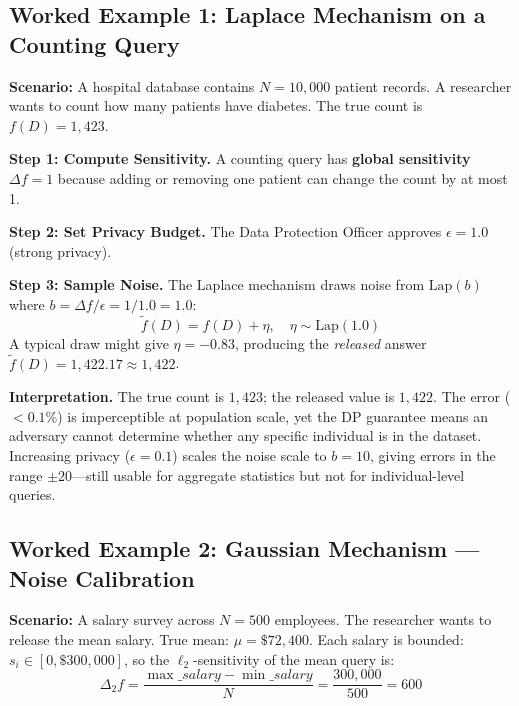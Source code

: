 \subsection{Worked Example 1: Laplace Mechanism on a Counting Query}
\label{subsec:laplace_example}

\textbf{Scenario:} A hospital database contains $N = 10{,}000$ patient records. A researcher wants to count how many patients have diabetes. The true count is $f(D) = 1{,}423$.

\textbf{Step 1: Compute Sensitivity.}
A counting query has \textbf{global sensitivity} $\Delta f = 1$ because adding or removing one patient can change the count by at most 1.

\textbf{Step 2: Set Privacy Budget.}
The Data Protection Officer approves $\epsilon = 1.0$ (strong privacy).

\textbf{Step 3: Sample Noise.}
The Laplace mechanism draws noise from $\text{Lap}(b)$ where $b = \Delta f / \epsilon = 1/1.0 = 1.0$:
\begin{equation}
  \tilde{f}(D) = f(D) + \eta, \quad \eta \sim \text{Lap}(1.0)
\end{equation}
A typical draw might give $\eta = -0.83$, producing the \emph{released} answer $\tilde{f}(D) = 1{,}422.17 \approx 1{,}422$.

\textbf{Interpretation.}
The true count is $1{,}423$; the released value is $1{,}422$. The error ($< 0.1\%$) is imperceptible at population scale, yet the DP guarantee means an adversary cannot determine whether any specific individual is in the dataset. Increasing privacy ($\epsilon = 0.1$) scales the noise scale to $b = 10$, giving errors in the range $\pm 20$—still usable for aggregate statistics but not for individual-level queries.

\subsection{Worked Example 2: Gaussian Mechanism — Noise Calibration}
\label{subsec:gaussian_example}

\textbf{Scenario:} A salary survey across $N = 500$ employees. The researcher wants to release the mean salary. True mean: $\mu = \$72{,}400$. Each salary is bounded: $s_i \in [0, \$300{,}000]$, so the $\ell_2$-sensitivity of the mean query is:
\begin{equation}
  \Delta_2 f = \frac{\max\_salary - \min\_salary}{N} = \frac{300{,}000}{500} = 600
\end{equation}


